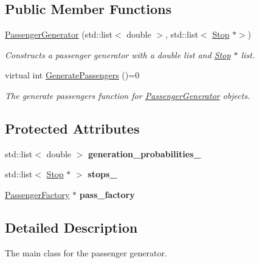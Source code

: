 \subsection*{Public Member Functions}
\begin{DoxyCompactItemize}
\item 
\hyperlink{classPassengerGenerator_a33eeed8b68d5d596ceef5381c697e49d}{Passenger\+Generator} (std\+::list$<$ double $>$, std\+::list$<$ \hyperlink{classStop}{Stop} $\ast$$>$)
\begin{DoxyCompactList}\small\item\em Constructs a passenger generator with a double list and \hyperlink{classStop}{Stop} $\ast$ list. \end{DoxyCompactList}\item 
virtual int \hyperlink{classPassengerGenerator_ad2db96a13b34fcf35977287c06b31d47}{Generate\+Passengers} ()=0
\begin{DoxyCompactList}\small\item\em The generate passengers function for \hyperlink{classPassengerGenerator}{Passenger\+Generator} objects. \end{DoxyCompactList}\end{DoxyCompactItemize}
\subsection*{Protected Attributes}
\begin{DoxyCompactItemize}
\item 
\mbox{\label{classPassengerGenerator_a855471e5532fec3f387a6340f928d43a}} 
std\+::list$<$ double $>$ {\bfseries generation\+\_\+probabilities\+\_\+}
\item 
\mbox{\label{classPassengerGenerator_ab09ab7ca9104385ae007d05a6e957884}} 
std\+::list$<$ \hyperlink{classStop}{Stop} $\ast$ $>$ {\bfseries stops\+\_\+}
\item 
\mbox{\label{classPassengerGenerator_a3fb4e7939da69cd257680761488f39ac}} 
\hyperlink{classPassengerFactory}{Passenger\+Factory} $\ast$ {\bfseries pass\+\_\+factory}
\end{DoxyCompactItemize}


\subsection{Detailed Description}
The main class for the passenger generator. 

